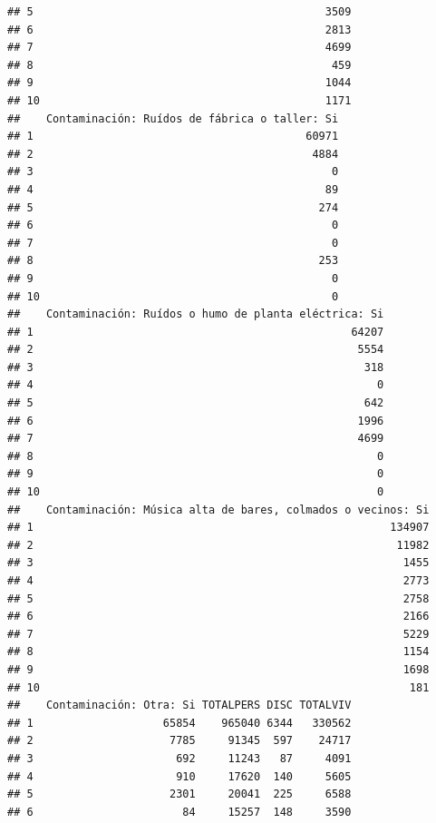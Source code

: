\documentclass[11pt,]{article}
\begin{document}
\begin{verbatim}
## 5                                             3509
## 6                                             2813
## 7                                             4699
## 8                                              459
## 9                                             1044
## 10                                            1171
##    Contaminación: Ruídos de fábrica o taller: Si
## 1                                          60971
## 2                                           4884
## 3                                              0
## 4                                             89
## 5                                            274
## 6                                              0
## 7                                              0
## 8                                            253
## 9                                              0
## 10                                             0
##    Contaminación: Ruídos o humo de planta eléctrica: Si
## 1                                                 64207
## 2                                                  5554
## 3                                                   318
## 4                                                     0
## 5                                                   642
## 6                                                  1996
## 7                                                  4699
## 8                                                     0
## 9                                                     0
## 10                                                    0
##    Contaminación: Música alta de bares, colmados o vecinos: Si
## 1                                                       134907
## 2                                                        11982
## 3                                                         1455
## 4                                                         2773
## 5                                                         2758
## 6                                                         2166
## 7                                                         5229
## 8                                                         1154
## 9                                                         1698
## 10                                                         181
##    Contaminación: Otra: Si TOTALPERS DISC TOTALVIV
## 1                    65854    965040 6344   330562
## 2                     7785     91345  597    24717
## 3                      692     11243   87     4091
## 4                      910     17620  140     5605
## 5                     2301     20041  225     6588
## 6                       84     15257  148     3590

\end{verbatim}
\end{document}
